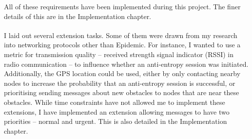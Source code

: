 \documentclass[12pt,a4paper]{report}
\begin{document}
All of these requirements have been implemented during this project. The finer details of this are in the Implementation chapter. \\ \\ I laid out several extension tasks. Some of them were drawn from my research into networking protocols other than Epidemic. For instance, I wanted to use a metric for transmission quality -- received strength signal indicator (RSSI) in radio communication -- to influence whether an anti-entropy session was initiated. Additionally, the GPS location could be used, either by only contacting nearby nodes to increase the probability that an anti-entropy session is successful, or prioritising sending messages about new obstacles to nodes that are near these obstacles. While time constraints have not allowed me to implement these extensions, I have implemented an extension allowing messages to have two priorities -- normal and urgent. This is also detailed in the Implementation chapter. 
\end{document}
